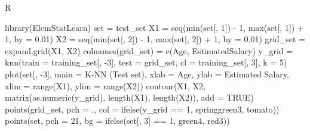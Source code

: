 \documentclass[
]{book}
\newenvironment{Shaded}{\begin{snugshade}}{\end{snugshade}}
\newcommand{\AttributeTok}[1]{\textcolor[rgb]{0.77,0.63,0.00}{#1}}
\newcommand{\ConstantTok}[1]{\textcolor[rgb]{0.00,0.00,0.00}{#1}}
\newcommand{\DecValTok}[1]{\textcolor[rgb]{0.00,0.00,0.81}{#1}}
\newcommand{\FloatTok}[1]{\textcolor[rgb]{0.00,0.00,0.81}{#1}}
\newcommand{\FunctionTok}[1]{\textcolor[rgb]{0.00,0.00,0.00}{#1}}
\newcommand{\NormalTok}[1]{#1}
\newcommand{\OtherTok}[1]{\textcolor[rgb]{0.56,0.35,0.01}{#1}}
\newcommand{\SpecialCharTok}[1]{\textcolor[rgb]{0.00,0.00,0.00}{#1}}
\newcommand{\StringTok}[1]{\textcolor[rgb]{0.31,0.60,0.02}{#1}}
\theoremstyle{definition}
\theoremstyle{definition}
\theoremstyle{definition}
\theoremstyle{definition}
\theoremstyle{remark}
\begin{document}
R

\begin{Shaded}
\begin{Highlighting}[]
\FunctionTok{library}\NormalTok{(ElemStatLearn)}
\NormalTok{set }\OtherTok{=}\NormalTok{ test\_set}
\NormalTok{X1 }\OtherTok{=} \FunctionTok{seq}\NormalTok{(}\FunctionTok{min}\NormalTok{(set[, }\DecValTok{1}\NormalTok{]) }\SpecialCharTok{{-}} \DecValTok{1}\NormalTok{, }\FunctionTok{max}\NormalTok{(set[, }\DecValTok{1}\NormalTok{]) }\SpecialCharTok{+} \DecValTok{1}\NormalTok{, }\AttributeTok{by =} \FloatTok{0.01}\NormalTok{)}
\NormalTok{X2 }\OtherTok{=} \FunctionTok{seq}\NormalTok{(}\FunctionTok{min}\NormalTok{(set[, }\DecValTok{2}\NormalTok{]) }\SpecialCharTok{{-}} \DecValTok{1}\NormalTok{, }\FunctionTok{max}\NormalTok{(set[, }\DecValTok{2}\NormalTok{]) }\SpecialCharTok{+} \DecValTok{1}\NormalTok{, }\AttributeTok{by =} \FloatTok{0.01}\NormalTok{)}
\NormalTok{grid\_set }\OtherTok{=} \FunctionTok{expand.grid}\NormalTok{(X1, X2)}
\FunctionTok{colnames}\NormalTok{(grid\_set) }\OtherTok{=} \FunctionTok{c}\NormalTok{(}\StringTok{\textquotesingle{}Age\textquotesingle{}}\NormalTok{, }\StringTok{\textquotesingle{}EstimatedSalary\textquotesingle{}}\NormalTok{)}
\NormalTok{y\_grid }\OtherTok{=} \FunctionTok{knn}\NormalTok{(}\AttributeTok{train =}\NormalTok{ training\_set[, }\SpecialCharTok{{-}}\DecValTok{3}\NormalTok{], }\AttributeTok{test =}\NormalTok{ grid\_set, }\AttributeTok{cl =}\NormalTok{ training\_set[, }\DecValTok{3}\NormalTok{], }\AttributeTok{k =} \DecValTok{5}\NormalTok{)}
\FunctionTok{plot}\NormalTok{(set[, }\SpecialCharTok{{-}}\DecValTok{3}\NormalTok{],}
     \AttributeTok{main =} \StringTok{\textquotesingle{}K{-}NN (Test set)\textquotesingle{}}\NormalTok{,}
     \AttributeTok{xlab =} \StringTok{\textquotesingle{}Age\textquotesingle{}}\NormalTok{, }\AttributeTok{ylab =} \StringTok{\textquotesingle{}Estimated Salary\textquotesingle{}}\NormalTok{,}
     \AttributeTok{xlim =} \FunctionTok{range}\NormalTok{(X1), }\AttributeTok{ylim =} \FunctionTok{range}\NormalTok{(X2))}
\FunctionTok{contour}\NormalTok{(X1, X2, }\FunctionTok{matrix}\NormalTok{(}\FunctionTok{as.numeric}\NormalTok{(y\_grid), }\FunctionTok{length}\NormalTok{(X1), }\FunctionTok{length}\NormalTok{(X2)), }\AttributeTok{add =} \ConstantTok{TRUE}\NormalTok{)}
\FunctionTok{points}\NormalTok{(grid\_set, }\AttributeTok{pch =} \StringTok{\textquotesingle{}.\textquotesingle{}}\NormalTok{, }\AttributeTok{col =} \FunctionTok{ifelse}\NormalTok{(y\_grid }\SpecialCharTok{==} \DecValTok{1}\NormalTok{, }\StringTok{\textquotesingle{}springgreen3\textquotesingle{}}\NormalTok{, }\StringTok{\textquotesingle{}tomato\textquotesingle{}}\NormalTok{))}
\FunctionTok{points}\NormalTok{(set, }\AttributeTok{pch =} \DecValTok{21}\NormalTok{, }\AttributeTok{bg =} \FunctionTok{ifelse}\NormalTok{(set[, }\DecValTok{3}\NormalTok{] }\SpecialCharTok{==} \DecValTok{1}\NormalTok{, }\StringTok{\textquotesingle{}green4\textquotesingle{}}\NormalTok{, }\StringTok{\textquotesingle{}red3\textquotesingle{}}\NormalTok{))}
\end{Highlighting}
\end{Shaded}
\end{document}
